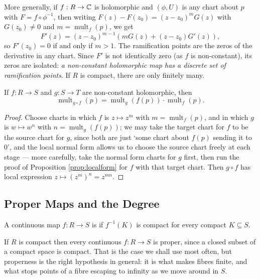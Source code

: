 \documentclass[a4paper]{scrartcl}
\newcommand{\mult}{\operatorname{mult}}
\begin{document}
\begin{remark}	More generally, if $f : R \to \mathbb{C}$ is holomorphic and $(\phi, U)$ is any chart about $p$
	with $F = f\circ\phi^{-1}$, then writing $F(z) - F(z_0) = (z-z_0)^m G(z)$ with
	$G(z_0)\ne 0$ and $m = \mult_f(p)$, we get
	$$
	F'(z) = (z-z_0)^{m-1}\left(mG(z) + (z-z_0)G'(z)\right),
	$$
	so $F'(z_0) = 0$ if and only if $m > 1$. The ramification points are the zeros of the
	derivative in any chart. Since $F'$ is not identically zero (as $f$ is non-constant),
	its zeros are isolated: \emph{a non-constant holomorphic map has a discrete set of
	ramification points}. If $R$ is compact, there are only finitely many.
\end{remark}

\begin{lemma}[Multiplicativity]\label{lem:multmult}
	If $f : R \to S$ and $g : S \to T$ are non-constant holomorphic, then
	$$
	\mult_{g\circ f}(p) = \mult_g(f(p))\cdot \mult_f(p).
	$$
\end{lemma}

\begin{proof}
	Choose charts in which $f$ is $z \mapsto z^{m}$ with $m = \mult_f(p)$, and in which $g$
	is $w \mapsto w^{n}$ with $n = \mult_g(f(p))$; we may take the target chart for $f$ to
	be the source chart for $g$, since both are just `some chart about $f(p)$ sending it to
	$0$', and the local normal form allows us to choose the source chart freely at each
	stage --- more carefully, take the normal form charts for $g$ first, then run the proof
	of Proposition \ref{prop:localform} for $f$ with that target chart. Then $g\circ f$ has
	local expression $z \mapsto (z^{m})^{n} = z^{mn}$.
\end{proof}

\subsection{Proper Maps and the Degree}

\begin{definition}
	A continuous map $f : R \to S$ is  if $f^{-1}(K)$ is compact for every
	compact $K \subseteq S$.
\end{definition}

If $R$ is compact then every continuous $f : R \to S$ is proper, since a closed subset of
a compact space is compact. That is the case we shall use most often, but properness is
the right hypothesis in general: it is what makes fibres finite, and what stops points of
a fibre escaping to infinity as we move around in $S$.
\end{document}
